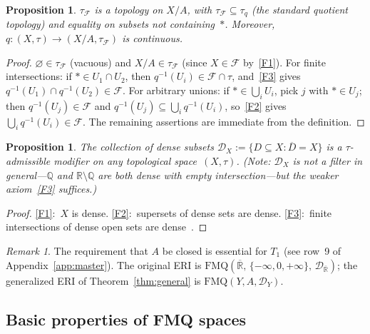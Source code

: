 \documentclass[11pt]{article}
\newtheorem{proposition}[theorem]{Proposition}
\theoremstyle{definition}
\theoremstyle{remark}
\newtheorem{remark}[theorem]{Remark}
\begin{document}
\begin{proposition}\label{prop:fmq-top}
$\tau_{\mathcal{F}}$ is a topology on $X/A$, with
$\tau_{\mathcal{F}} \subseteq \tau_q$ \textup{(}the standard quotient
topology\textup{)} and equality on subsets not containing~$\ast$.
Moreover, $q\colon (X, \tau) \to (X/A, \tau_{\mathcal{F}})$ is
continuous.
\end{proposition}

\begin{proof}
$\varnothing \in \tau_{\mathcal{F}}$ (vacuous) and
$X/A \in \tau_{\mathcal{F}}$ (since $X \in \mathcal{F}$
by~\ref{F1}).
For finite intersections: if $\ast \in U_1 \cap U_2$, then
$q^{-1}(U_i) \in \mathcal{F} \cap \tau$, and~\ref{F3} gives
$q^{-1}(U_1) \cap q^{-1}(U_2) \in \mathcal{F}$.
For arbitrary unions: if $\ast \in \bigcup_i U_i$, pick $j$ with
$\ast \in U_j$; then $q^{-1}(U_j) \in \mathcal{F}$ and
$q^{-1}(U_j) \subseteq \bigcup_i q^{-1}(U_i)$, so~\ref{F2} gives
$\bigcup_i q^{-1}(U_i) \in \mathcal{F}$.
The remaining assertions are immediate from the definition.
\end{proof}

\begin{proposition}\label{prop:dense-admissible}
The collection of dense subsets
$\mathcal{D}_X := \{D \subseteq X : \overline{D} = X\}$
is a $\tau$-admissible modifier on any topological space~$(X,\tau)$.
\textup{(}Note: $\mathcal{D}_X$ is not a filter in general---$\mathbb{Q}$
and $\mathbb{R} \setminus \mathbb{Q}$ are both dense with empty
intersection---but the weaker axiom~\textup{\ref{F3}} suffices.\textup{)}
\end{proposition}

\begin{proof}
\ref{F1}:~$X$ is dense.
\ref{F2}:~supersets of dense sets are dense.
\ref{F3}:~finite intersections of dense open sets are
dense~\cite[1.3.5]{bib:engelking}.
\end{proof}

\begin{remark}\label{rmk:eri-fmq}
The requirement that $A$ be closed is essential for $T_1$
(see row~9 of Appendix~\ref{app:master}).
The original ERI is
$\mathrm{FMQ}(\overline{\mathbb{R}},\,\{-\infty,0,+\infty\},\,
\mathcal{D}_{\overline{\mathbb{R}}})$;
the generalized ERI of Theorem~\ref{thm:general} is
$\mathrm{FMQ}(Y, A, \mathcal{D}_Y)$.
\end{remark}

\subsection{Basic properties of FMQ spaces}
\end{document}
